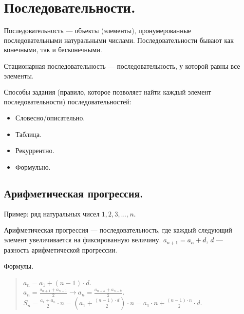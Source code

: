 \documentclass[12pt]{article}
\begin{document}
	\tableofcontents
	\setcounter{tocdepth}{3}
	\newpage
	\section{Последовательности.}
	\begin{definition}
		Последовательность --- объекты (элементы), пронумерованные последовательными натуральными числами. Последовательности бывают как конечными, так и бесконечными.
	\end{definition}
	\begin{definition}
		Стационарная последовательность --- последовательность, у которой равны все элементы.
	\end{definition}
	\begin{note}
		Способы задания (правило, которое позволяет найти каждый элемент последовательности) последовательностей:
		\begin{itemize}
			\item Словесно/описательно.
			\item Таблица.
			\item Рекуррентно.
			\item Формульно.
		\end{itemize}
	\end{note}
	\subsection{Арифметическая прогрессия.}
	Пример: ряд натуральных чисел $1, 2, 3, \dots, n$.
	\begin{definition}
		Арифметическая прогрессия --- последовательность, где каждый следующий элемент увеличивается на фиксированную величину. $a_{n + 1} = a_n + d$, $d$ --- разность арифметической прогрессии.
	\end{definition}
	\begin{statement}
		Формулы.
		\begin{quote}
			$a_n = a_1 + (n - 1) \cdot d$. \\
			$a_n = \frac{a_{n + 1} + a_{n - 1}}{2} \rightarrow a_n = \frac{a_{n + k} + a_{n - k}}{2}$. \\
			$S_n = \frac{a_1 + a_n}{2} \cdot n = (a_1 + \frac{(n - 1) \cdot d}{2}) \cdot n = a_1 \cdot n + \frac{(n - 1) \cdot n}{2} \cdot d$.
		\end{quote}
	\end{statement}
\end{document}
